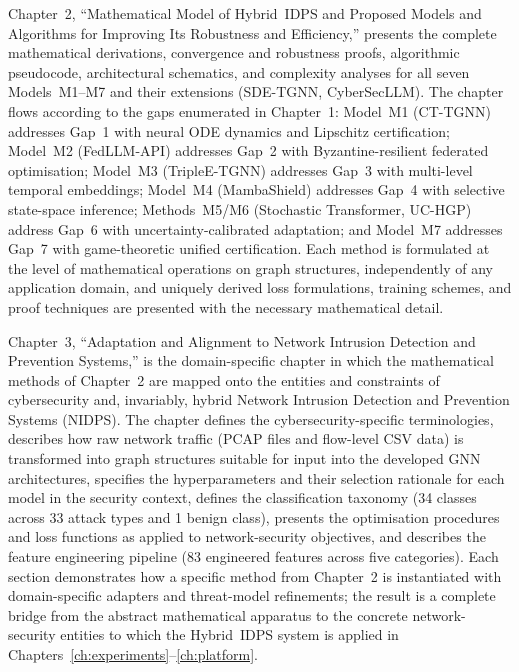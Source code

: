 Chapter~2, ``Mathematical Model of Hybrid~IDPS and Proposed Models and Algorithms for Improving Its Robustness and Efficiency,'' presents the complete mathematical derivations, convergence and robustness proofs, algorithmic pseudocode, architectural schematics, and complexity analyses for all seven Models~M1--M7 and their extensions (SDE-TGNN, CyberSecLLM). The chapter flows according to the gaps enumerated in Chapter~1: Model~M1 (CT-TGNN) addresses Gap~1 with neural ODE dynamics and Lipschitz certification; Model~M2 (FedLLM-API) addresses Gap~2 with Byzantine-resilient federated optimisation; Model~M3 (TripleE-TGNN) addresses Gap~3 with multi-level temporal embeddings; Model~M4 (MambaShield) addresses Gap~4 with selective state-space inference; Methods~M5/M6 (Stochastic Transformer, UC-HGP) address Gap~6 with uncertainty-calibrated adaptation; and Model~M7 addresses Gap~7 with game-theoretic unified certification. Each method is formulated at the level of mathematical operations on graph structures, independently of any application domain, and uniquely derived loss formulations, training schemes, and proof techniques are presented with the necessary mathematical detail.

Chapter~3, ``Adaptation and Alignment to Network Intrusion Detection and Prevention Systems,'' is the domain-specific chapter in which the mathematical methods of Chapter~2 are mapped onto the entities and constraints of cybersecurity and, invariably, hybrid Network Intrusion Detection and Prevention Systems (NIDPS). The chapter defines the cybersecurity-specific terminologies, describes how raw network traffic (PCAP files and flow-level CSV data) is transformed into graph structures suitable for input into the developed GNN architectures, specifies the hyperparameters and their selection rationale for each model in the security context, defines the classification taxonomy (34 classes across 33 attack types and 1 benign class), presents the optimisation procedures and loss functions as applied to network-security objectives, and describes the feature engineering pipeline (83 engineered features across five categories). Each section demonstrates how a specific method from Chapter~2 is instantiated with domain-specific adapters and threat-model refinements; the result is a complete bridge from the abstract mathematical apparatus to the concrete network-security entities to which the Hybrid~IDPS system is applied in Chapters~\ref{ch:experiments}--\ref{ch:platform}.

